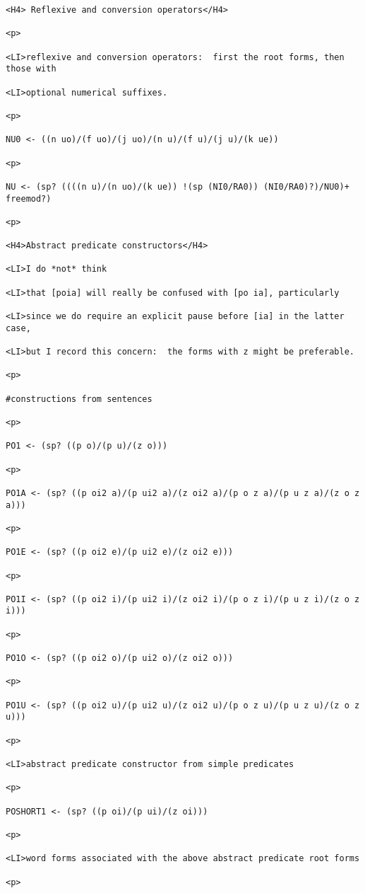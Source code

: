 \documentclass[12pt]{article}
\begin{document}
\begin{lstlisting}
<H4> Reflexive and conversion operators</H4>

<p>

<LI>reflexive and conversion operators:  first the root forms, then those with

<LI>optional numerical suffixes.

<p>

NU0 <- ((n uo)/(f uo)/(j uo)/(n u)/(f u)/(j u)/(k ue))

<p>

NU <- (sp? ((((n u)/(n uo)/(k ue)) !(sp (NI0/RA0)) (NI0/RA0)?)/NU0)+ freemod?)

<p>

<H4>Abstract predicate constructors</H4>

<LI>I do *not* think

<LI>that [poia] will really be confused with [po ia], particularly

<LI>since we do require an explicit pause before [ia] in the latter case,

<LI>but I record this concern:  the forms with z might be preferable.

<p>

#constructions from sentences

<p>

PO1 <- (sp? ((p o)/(p u)/(z o)))

<p>

PO1A <- (sp? ((p oi2 a)/(p ui2 a)/(z oi2 a)/(p o z a)/(p u z a)/(z o z a)))

<p>

PO1E <- (sp? ((p oi2 e)/(p ui2 e)/(z oi2 e)))

<p>

PO1I <- (sp? ((p oi2 i)/(p ui2 i)/(z oi2 i)/(p o z i)/(p u z i)/(z o z i)))

<p>

PO1O <- (sp? ((p oi2 o)/(p ui2 o)/(z oi2 o)))

<p>

PO1U <- (sp? ((p oi2 u)/(p ui2 u)/(z oi2 u)/(p o z u)/(p u z u)/(z o z u)))

<p>

<LI>abstract predicate constructor from simple predicates

<p>

POSHORT1 <- (sp? ((p oi)/(p ui)/(z oi)))

<p>

<LI>word forms associated with the above abstract predicate root forms

<p>


\end{lstlisting}
\end{document}
